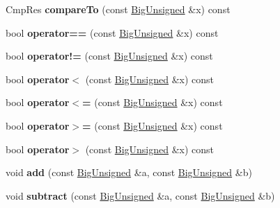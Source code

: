 \begin{DoxyCompactItemize}
Cmp\+Res {\bfseries compare\+To} (const \mbox{\hyperlink{class_big_unsigned}{Big\+Unsigned}} \&x) const
\item 
\mbox{\label{class_big_unsigned_a3983fc5786314c19ef44eeaede938b9a}} 
bool {\bfseries operator==} (const \mbox{\hyperlink{class_big_unsigned}{Big\+Unsigned}} \&x) const
\item 
\mbox{\label{class_big_unsigned_a0063424a35cb9cc76a00f9c69bf6394b}} 
bool {\bfseries operator!=} (const \mbox{\hyperlink{class_big_unsigned}{Big\+Unsigned}} \&x) const
\item 
\mbox{\label{class_big_unsigned_a39288a53ab43c1e0667c8a5244a6d9ec}} 
bool {\bfseries operator$<$} (const \mbox{\hyperlink{class_big_unsigned}{Big\+Unsigned}} \&x) const
\item 
\mbox{\label{class_big_unsigned_aac12d91035811b7440f61cbcbe9fca67}} 
bool {\bfseries operator$<$=} (const \mbox{\hyperlink{class_big_unsigned}{Big\+Unsigned}} \&x) const
\item 
\mbox{\label{class_big_unsigned_a36996a68c189233da3b363f5d4b21de8}} 
bool {\bfseries operator$>$=} (const \mbox{\hyperlink{class_big_unsigned}{Big\+Unsigned}} \&x) const
\item 
\mbox{\label{class_big_unsigned_aa0c88a8fbf83795a39534abeea80def4}} 
bool {\bfseries operator$>$} (const \mbox{\hyperlink{class_big_unsigned}{Big\+Unsigned}} \&x) const
\item 
\mbox{\label{class_big_unsigned_a80d5626becdf776cdcf71581d88c1305}} 
void {\bfseries add} (const \mbox{\hyperlink{class_big_unsigned}{Big\+Unsigned}} \&a, const \mbox{\hyperlink{class_big_unsigned}{Big\+Unsigned}} \&b)
\item 
\mbox{\label{class_big_unsigned_aeb9c7c804c94a6c6b5245835e90f3d46}} 
void {\bfseries subtract} (const \mbox{\hyperlink{class_big_unsigned}{Big\+Unsigned}} \&a, const \mbox{\hyperlink{class_big_unsigned}{Big\+Unsigned}} \&b)
\item 
\mbox{\label{class_big_unsigned_a56e41e62d008f897eb0445a7fed7900b}} 

\end{DoxyCompactItemize}
